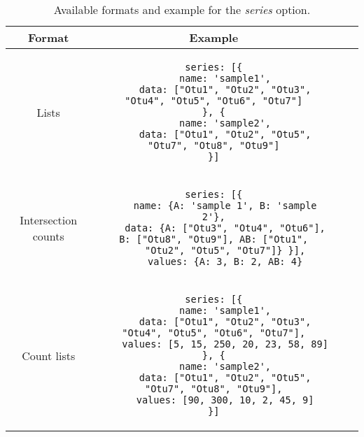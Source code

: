 \documentclass{bmcart}
\begin{document}
\begin{backmatter}
\begin{table}[h!]
\caption{Available formats and example for the \textit{series} option.}
      \begin{tabular}{cccc}
        \hline
        Format & Example\\ \hline
        Lists & 
\begin{lstlisting}
series: [{
	name: 'sample1',
	data: ["Otu1", "Otu2", "Otu3", "Otu4", "Otu5", "Otu6", "Otu7"]
}, {
	name: 'sample2',
	data: ["Otu1", "Otu2", "Otu5", "Otu7", "Otu8", "Otu9"]
}]
\end{lstlisting}\\ \hline
        Intersection counts & 
\begin{lstlisting}
series: [{
	name: {A: 'sample 1', B: 'sample 2'},
	data: {A: ["Otu3", "Otu4", "Otu6"], B: ["Otu8", "Otu9"], AB: ["Otu1",
	"Otu2", "Otu5", "Otu7"]} }],
	values: {A: 3, B: 2, AB: 4}
\end{lstlisting}\\ \hline
        Count lists  &
\begin{lstlisting}
series: [{
	name: 'sample1',
	data: ["Otu1", "Otu2", "Otu3", "Otu4", "Otu5", "Otu6", "Otu7"],
	values: [5, 15, 250, 20, 23, 58, 89]
}, {
	name: 'sample2',
	data: ["Otu1", "Otu2", "Otu5", "Otu7", "Otu8", "Otu9"],
	values: [90, 300, 10, 2, 45, 9]
}]
\end{lstlisting}\\ \hline
      \end{tabular}
\end{table}

\end{backmatter}
\end{document}

